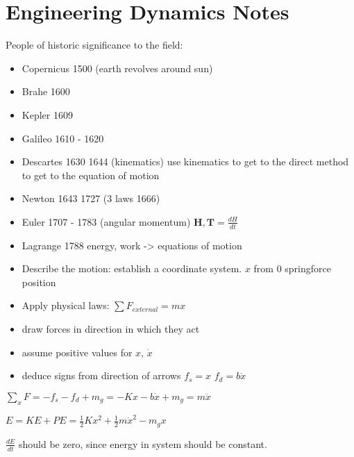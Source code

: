 \section{Engineering Dynamics Notes}

People of historic significance to the field:
\begin{itemize}
\item Copernicus 1500 (earth revolves around sun)
\item Brahe 1600
\item Kepler 1609
\item Galileo 1610 - 1620
\item Descartes 1630 1644 (kinematics) use kinematics to get to the direct method to get to the equation of motion
\item Newton 1643 1727 (3 laws 1666)
\item Euler 1707 - 1783 (angular momentum) $\mathbf H, \mathbf T = \frac{dH}{dt}$
\item Lagrange 1788 energy, work -> equations of motion
\end{itemize}

\begin{tikzpicture}
  
\end{tikzpicture}


\begin{itemize}
  \item Describe the motion: establish a coordinate system. $x$ from $0$ springforce position
  \item Apply physical laws: $\sum F_{external} = mx$
\end{itemize}    

\begin{itemize}
  \item draw forces in direction in which they act
  \item assume positive values for $x$, $\dot{x}$
  \item deduce signs from direction of arrows
      $f_s = x$
      $f_d = b\dot{x}$
\end{itemize}

$\sum_x F = -f_s - f_d + m_g = -Kx - b\dot{x} + m_g = m\ddot{x}$ 

\begin{tikzpicture}
  
\end{tikzpicture}

$E = KE + PE = \frac{1}{2}Kx^2+\frac{1}{2}m\dot{x}^2-m_g x$

$\frac{dE}{dt}$ should be zero, since energy in system should be constant.

